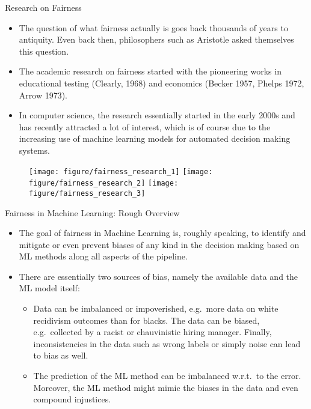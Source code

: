 \documentclass[11pt,compress,t,notes=noshow, xcolor=table]{beamer}
\begin{document}
\begin{vbframe}{Research on Fairness}
%
	\small
	\begin{itemize}
		\item The question of what fairness actually is goes back thousands of years to antiquity. Even back then, philosophers such as Aristotle asked themselves this question.
	\end{itemize}
	\begin{minipage}{0.5\textwidth}
		\begin{itemize}
			\item The academic research on fairness started with the pioneering works in educational testing (Clearly, 1968) and economics (Becker 1957, Phelps 1972, Arrow 1973).
			\item In computer science, the research essentially started in the early 2000s and has recently attracted a lot of interest, which is of course due to the increasing use of machine learning models for automated decision making systems.
		\end{itemize}
	\end{minipage}
	\begin{minipage}{0.45\textwidth}
		\begin{figure}
			\centering
			\texttt{[image: figure/fairness\_research\_1]}
			\texttt{[image: figure/fairness\_research\_2]}
			\texttt{[image: figure/fairness\_research\_3]}
		\end{figure}
	\end{minipage}
%
\end{vbframe} 

\begin{vbframe}{Fairness in Machine Learning: Rough Overview}
%
  \begin{itemize}
%    
    \item The goal of fairness in Machine Learning is, roughly speaking, to identify and mitigate or even prevent biases of any kind in the decision making based on ML methods along all aspects of the pipeline.
%    
	\item There are essentially two sources of bias, namely the available data and the ML model itself:
%	
	\begin{itemize}
%		
		\item Data can be imbalanced or impoverished, e.g.\ more data on white recidivism outcomes than for blacks. The data can be biased, e.g.\ collected by a racist or chauvinistic hiring manager. Finally, inconsistencies in the data such as wrong labels or simply noise can lead to bias as well.
%		
		\item The prediction of the ML method can be imbalanced w.r.t.\ to the error. Moreover, the ML method might mimic the biases in the data and even compound injustices.
%
	\end{itemize}
%
  \end{itemize}
%
\end{vbframe}
\end{document}
